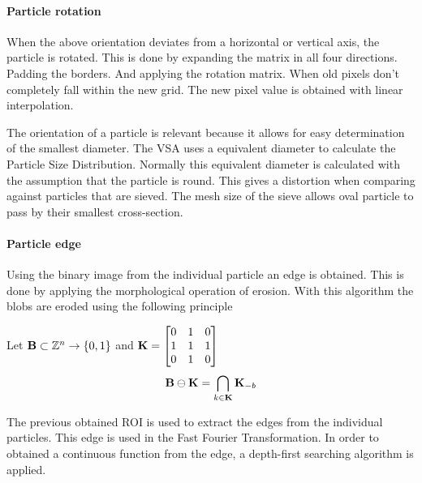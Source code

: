 \documentclass[11pt,fleqn,,a4paper,twoside,openright]{book}
\begin{document}
\paragraph{Particle rotation}\label{Particle rotation}
When the above orientation deviates from a horizontal or vertical axis, the particle is rotated. This is done by expanding the matrix in all four directions. Padding the borders. And applying the rotation matrix. When old pixels don't completely fall within the new grid. The new pixel value is obtained with linear interpolation.

\begin{remark}
	The orientation of a particle is relevant because it allows for easy determination of the smallest diameter. The VSA uses a equivalent diameter to calculate the Particle Size Distribution. Normally this equivalent diameter is calculated with the assumption that the particle is round. This gives a distortion when comparing against particles that are sieved. The mesh size of the sieve allows oval particle to pass by their smallest cross-section.
\end{remark}

\paragraph{Particle edge}
Using the binary image from the individual particle an edge is obtained. This is done by applying the morphological operation of erosion. With this algorithm the blobs are eroded using the following principle
\begin{sBox}
	Let $\mat{B} \subset \mathbb{Z}^n \rightarrow \{0, 1\}$ and $ \mat{K} = \begin{bmatrix}
	0 & 1 & 0 \\
	1 & 1 & 1 \\
	0 & 1 & 0 \\
	\end{bmatrix} $
	\begin{equation}
	\mat{B}  \ominus \mat{K} = \bigcap_{k\in \mat{K}} \mat{K}_{-b}
	\end{equation}
\end{sBox}

The previous obtained ROI is used to extract the edges from the individual particles. This edge is used in the Fast Fourier Transformation. In order to obtained a continuous function from the edge, a depth-first searching algorithm is applied. 
\end{document}

